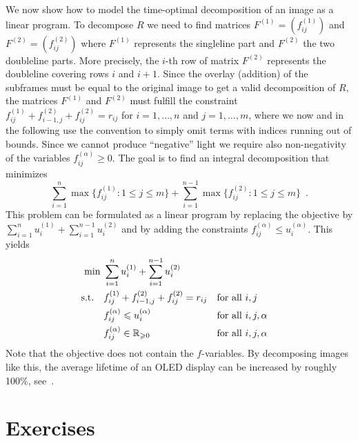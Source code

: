 We now show how to model the time-optimal decomposition of an image as
a linear program. 
To decompose $R$ we need to find matrices
$F^{(1)}=(f_{ij}^{(1)})$ and $F^{(2)}=(f_{ij}^{(2)})$ where $F^{(1)}$
represents the singleline part and $F^{(2)}$ the two doubleline parts.
More precisely, the $i$-th row of matrix $F^{(2)}$ represents the
doubleline covering rows $i$ and $i+1$.  Since the overlay (addition)
of the subframes must be equal to the original image to get a valid
decomposition of $R$, the matrices $F^{(1)}$ and $F^{(2)}$ must
fulfill the constraint $f^{(1)}_{ij} + f^{(2)}_{i-1,j} +
f^{(2)}_{ij}=r_{ij}$ for $i=1,\dots,n$ and $j=1,\dots,m$, where we now
and in the following use the convention to simply omit terms with
indices running out of bounds.  Since we cannot produce ``negative''
light we require also non-negativity of the variables
$f^{(\alpha)}_{ij}\geq0$.  The goal is to find an integral decomposition
that minimizes
\begin{equation*}
\sum_{i=1}^n \max \{ f^{(1)}_{ij}: 1 \leq j \leq m \} + \sum_{i=1}^{n-1} \max \{
f^{(2)}_{ij}: 1 \leq j \leq m \}\enspace.
\end{equation*}
This problem can be formulated as a  linear program by
replacing the objective by $\sum_{i=1}^n u^{(1)}_i +
\sum_{i=1}^{n-1}u^{(2)}_i$ and by adding the constraints $ f^{(\alpha)}_{ij} \leq
u^{(\alpha)}_i$.  This yields
\begin{align}
  \min~ & \sum_{i=1}^n u^{(1)}_i+\sum_{i=1}^{n-1}u^{(2)}_i\nonumber\\
  \text{s.t.}\quad & f^{(1)}_{ij} + f^{(2)}_{i-1,j} + f^{(2)}_{ij} = r_{ij}
  &&\text{for all $i,j$}\label{eqn:original}\\
  & f^{(\alpha)}_{ij} \leqslant u^{(\alpha)}_i
  &&\text{for all $i,j,\alpha$}\\
   & f^{(\alpha)}_{ij} \in\mathbb{R}_{\geqslant 0}
  &&\text{for all $i,j,\alpha$} \nonumber\nonumber
\end{align}
%
Note that the objective does not contain the $f$-variables. By
decomposing images like this, the average lifetime of an OLED display
can be increased by roughly 100\%, see~\cite{EKX07}. 


\section*{Exercises}

